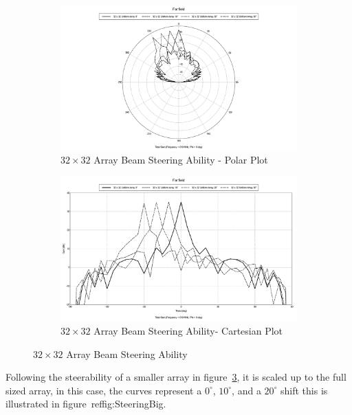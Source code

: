 \documentclass[11pt]{witseiepaper}
\begin{document}
\begin{figure}[htb]
    \centering
    \begin{subfigure}{.5\textwidth}
        \centering
            \includegraphics[width=0.9\linewidth]{SteeringSmall-Polar.pdf}
            \caption{$32 \times 32$ Array Beam Steering Ability - Polar Plot}
            \label{fig:SteeringSmall-Polar}
        \end{subfigure}%
        \begin{subfigure}{.5\textwidth}
            \centering
            \includegraphics[width=0.9\linewidth]{SteeringSmall-Cartesian.pdf}
            \caption{$32 \times 32$ Array Beam Steering Ability- Cartesian Plot}
                \label{fig:SteeringSmall-Cartesian}
            \end{subfigure}
\caption{$32 \times 32$ Array Beam Steering Ability}
\label{fig:SteeringSmall}
\end{figure}




Following the steerability of a smaller array in figure~\ref{fig:SteeringSmall}, it is scaled up to the full sized array, in this case, the curves represent a $0^{\circ}$, $10^{\circ}$, and a $20^{\circ}$ shift this is illustrated in figure~ref{fig:SteeringBig}.
\end{document}
